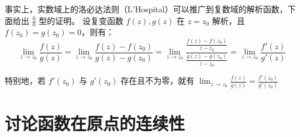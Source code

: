 \documentclass[UTF8]{report}
\theoremstyle{MyLineTheoremStyle} %
\theoremstyle{MyBlockTheoremStyle} %
\theoremstyle{MySubsubsectionStyle} %
\begin{document}
事实上，实数域上的洛必达法则（L'Hospital）可以推广到复数域的解析函数，下面给出 $\frac{0}{0}$ 型的证明。
设复变函数 $f(z), g(z)$ 在 $z = z_0$ 解析，且 $f(z_0) = g(z_0) = 0$，则有：
\begin{equation*}
\lim_{z\to z_0} \frac{f(z)}{g(z)} 
= \lim_{z\to z_0} \frac{f(z) - f(z_0)}{g(z) - g(z_0)} 
= \lim_{z\to z_0} \frac{\frac{f(z) - f(z_0)}{z-z_0}}{\frac{g(z) - g(z_0)}{z-z_0}} 
= \lim_{z\to z_0} \frac{f'(z)}{g'(z)}
\end{equation*}

特别地，若 $f'(z_0)$ 与 $g'(z_0)$ 存在且不为零，就有 $\lim_{z\to z_0} \frac{f(z)}{g(z)} = \frac{f'(z_0)}{g'(z_0)}$

\section{讨论函数在原点的连续性}
\end{document}
